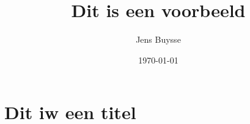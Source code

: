 \documentclass[11pt,twoside,a4paper]{article}
\author{Jens Buysse}
\title{Dit is een voorbeeld}
\date{\today}
\begin{document}
	\maketitle
	
	
\section{Dit iw een titel}
	
\end{document}
